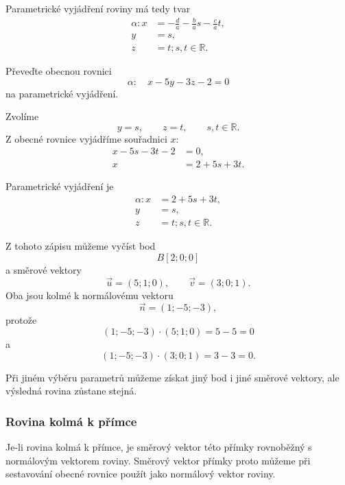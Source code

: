 Parametrické vyjádření roviny má tedy tvar
\[
    \begin{aligned}
        \alpha: x&=-\frac{d}{a}-\frac{b}{a}s-\frac{c}{a}t,\\
        y&=s,\\
        z&=t; s,t\in\mathbb{R}.
    \end{aligned}
\]

\begin{example}
    \label{exa:General_to_parametric_plane}
    Převeďte obecnou rovnici
    \[
        \alpha:\quad x-5y-3z-2=0
    \]
    na parametrické vyjádření.

    Zvolíme
    \[
        y=s,
        \qquad
        z=t,
        \qquad
        s,t\in\mathbb{R}.
    \]
    Z obecné rovnice vyjádříme souřadnici $x$:
    \begin{align*}
        x-5s-3t-2&=0,\\
        x&=2+5s+3t.
    \end{align*}

    Parametrické vyjádření je
    \[
        \begin{aligned}
            \alpha: x&=2+5s+3t,\\
            y&=s,\\
            z&=t; s,t\in\mathbb{R}.
        \end{aligned}
    \]

    Z tohoto zápisu můžeme vyčíst bod
    \[
        B[2;0;0]
    \]
    a směrové vektory
    \[
        \vec{u}=(5;1;0),
        \qquad
        \vec{v}=(3;0;1).
    \]
    Oba jsou kolmé k normálovému vektoru
    \[
        \vec{n}=(1;-5;-3),
    \]
    protože
    \[
        (1;-5;-3)\cdot(5;1;0)=5-5=0
    \]
    a
    \[
        (1;-5;-3)\cdot(3;0;1)=3-3=0.
    \]
\end{example}

Při jiném výběru parametrů můžeme získat jiný bod i jiné směrové vektory,
ale výsledná rovina zůstane stejná.

\subsubsection{Rovina kolmá k přímce}
\label{subsubsec:Plane_perpendicular_to_line}

Je-li rovina kolmá k přímce, je směrový vektor této přímky rovnoběžný
s normálovým vektorem roviny. Směrový vektor přímky proto můžeme při
sestavování obecné rovnice použít jako normálový vektor roviny.

